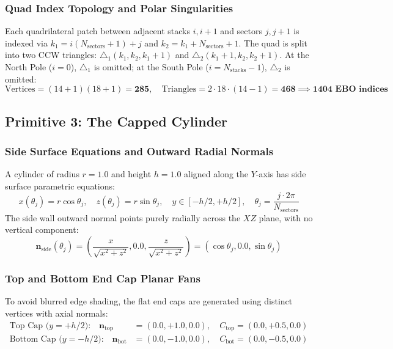 \documentclass[11pt,a4paper]{article}
\begin{document}
\subsubsection{Quad Index Topology and Polar Singularities}
Each quadrilateral patch between adjacent stacks $i, i+1$ and sectors $j, j+1$ is indexed via $k_1 = i(N_{\text{sectors}} + 1) + j$ and $k_2 = k_1 + N_{\text{sectors}} + 1$. The quad is split into two CCW triangles: $\triangle_1(k_1, k_2, k_1+1)$ and $\triangle_2(k_1+1, k_2, k_2+1)$. At the North Pole ($i = 0$), $\triangle_1$ is omitted; at the South Pole ($i = N_{\text{stacks}}-1$), $\triangle_2$ is omitted:
\begin{equation}
    \text{Vertices} = (14 + 1)(18 + 1) = \mathbf{285}, \quad \text{Triangles} = 2 \cdot 18 \cdot (14 - 1) = \mathbf{468} \implies \mathbf{1404 \text{ EBO indices}}
\end{equation}




\subsection{Primitive 3: The Capped Cylinder}

\subsubsection{Side Surface Equations and Outward Radial Normals}
A cylinder of radius $r = 1.0$ and height $h = 1.0$ aligned along the $Y$-axis has side surface parametric equations:
\begin{equation}
    x(\theta_j) = r \cos\theta_j, \quad z(\theta_j) = r \sin\theta_j, \quad y \in [-h/2, +h/2], \quad \theta_j = \frac{j \cdot 2\pi}{N_{\text{sectors}}}
\end{equation}
The side wall outward normal points purely radially across the $XZ$ plane, with no vertical component:
\begin{equation}
    \mathbf{n}_{\text{side}}(\theta_j) = \left(\frac{x}{\sqrt{x^2+z^2}}, 0.0, \frac{z}{\sqrt{x^2+z^2}}\right) = \left(\cos\theta_j, 0.0, \sin\theta_j\right)
\end{equation}

\subsubsection{Top and Bottom End Cap Planar Fans}
To avoid blurred edge shading, the flat end caps are generated using distinct vertices with axial normals:
\begin{align}
    \text{Top Cap ($y = +h/2$):}    \quad \mathbf{n}_{\text{top}} &= (0.0, +1.0, 0.0), \quad C_{\text{top}} = (0.0, +0.5, 0.0) \\
    \text{Bottom Cap ($y = -h/2$):} \quad \mathbf{n}_{\text{bot}} &= (0.0, -1.0, 0.0), \quad C_{\text{bot}} = (0.0, -0.5, 0.0)
\end{align}
\end{document}
